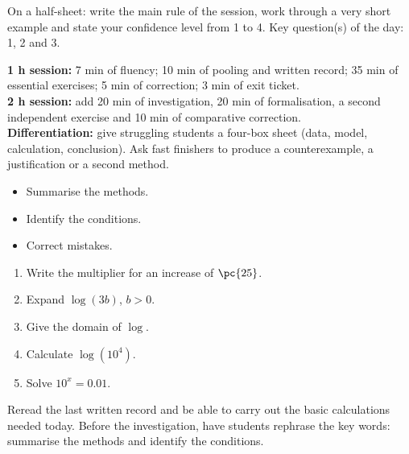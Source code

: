 \begin{exitticket}[3 minutes]On a half-sheet: write the main rule of the session, work through a very short example and state your confidence level from 1 to 4. Key question(s) of the day: 1, 2 and 3.\end{exitticket}

\ifmxteacher
\begin{method}
\textbf{1 h session:} 7 min of fluency; 10 min of pooling and written record; 35 min of essential exercises; 5 min of correction; 3 min of exit ticket.\\
\textbf{2 h session:} add 20 min of investigation, 20 min of formalisation, a second independent exercise and 10 min of comparative correction.\\
\textbf{Differentiation:} give struggling students a four-box sheet (data, model, calculation, conclusion). Ask fast finishers to produce a counterexample, a justification or a second method.
\end{method}
\fi
{}
\begin{objectives}\begin{itemize}\item Summarise the methods.\item Identify the conditions.\item Correct mistakes.\end{itemize}\end{objectives}
\begin{fluency}\begin{enumerate}\item Write the multiplier for an increase of $\pc{25}$. \item Expand $\log(3b)$, $b>0$. \item Give the domain of $\log$. \mxblank{$]0,+\infty[$}\item Calculate $\log(10^4)$. \item Solve $10^x=\num{0,01}$. \end{enumerate}\end{fluency}
\begin{prerequisites}Reread the last written record and be able to carry out the basic calculations needed today. Before the investigation, have students rephrase the key words: summarise the methods and identify the conditions.\end{prerequisites}

